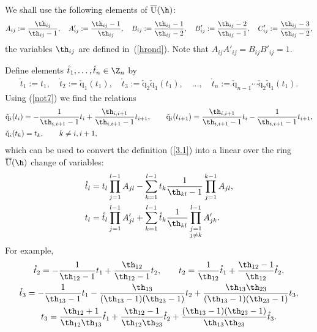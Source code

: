 \documentclass[11pt]{article}
\def\Cprime{C'}\def\ds{\displaystyle}\newcommand{\fracds}[2]{{\ds \frac{#1}{#2}}}
\def\q{\check{\mathrm q}}\def\Q{\mathrm{Q}}\def\r#1{(\ref{#1})}\let\rf=\r
\def\tphi{A}\def\tpsi{A'}\def\tphiplus{B}\def\tpsiminus{B'}\def\ttphi{B}\def\ttpsi{B'}\def\ts{\hskip1pt}\def\tts{\hskip.5pt}
\def\tt{\mathring{t}}\def\U{\mathrm{U}}\def\Uh{\overline{\U}(\h)}\def\UU{\overline{\U}}\def\UUh{{\cal{D}}(\h)}
\numberwithin{equation}{section}
\begin{document}
We shall use the following elements of $\Uh$:
\begin{gather*}  \tphi_{ij}:=\frac{\th_{ij}}{\th_{ij}-1}  ,\quad \tpsi_{ij}:=\frac{\th_{ij}-1}{\th_{ij}} ,
\quad \ttphi_{ij}:=\frac{\th_{ij}-1}{\th_{ij}-2} ,\quad \ttpsi_{ij}:=\frac{\th_{ij}-2}{\th_{ij}-1} ,\quad \Cprime_{ij}:=\frac{\th_{ij}-3}{\th_{ij}-2},
\end{gather*}
the variables $\th_{ij}$ are def\/ined in~\rf{hrond}. Note that $\tphi_{ij}\tpsi_{ij}=\ttphi_{ij}\ttpsi_{ij}=1$.


Def\/ine  elements $\tt_1,\ldots, \tt_n\in\Z_n$ by
\begin{gather*}
\label{3.1}
\tt_1:=t_1 ,\quad\tt_2:=\q_{1}(t_1) ,\quad\tt_3:=\q_{2}\q_{1}(t_1) ,
\quad\ldots, \quad \tt_n:=\q_{n-1}\cdots \q_{2}\q_{1}(t_1)  .
\end{gather*}
Using \rf{not7} we f\/ind the relations
 \begin{gather}
 \begin{split}
& \q_i(t_i)  =-\frac{1}{\th_{i,i+1}-1}t_i+\frac{\th_{i,i+1}}{\th_{i,i+1}-1}t_{i+1}  ,
\qquad \q_i(t_{i+1})= \frac{\th_{i,i+1}}{\th_{i,i+1}-1}t_i-\frac{1}{\th_{i,i+1}-1}t_{i+1} ,\\ %
& \q_i(t_k) =  t_k ,\qquad k\not=i,i+1  ,
 \end{split}\label{acwot}
 \end{gather}
which can be used to convert the def\/inition \rf{3.1} into  a linear over the ring $\Uh$ change of variables:
\begin{gather}
\begin{split}
& \ds{\tt_l} =\ds{t_l\prod_{j=1}^{l-1}\tphi_{jl}
-\sum_{k=1}^{l-1}t_k\frac{1}{\th_{kl}-1}\prod_{j=1}^{k-1}\tphi_{jl}}  , \\
& \ds{t_l} =\ds{\tt_l\prod_{j=1}^{l-1}\tpsi_{jl} +\sum_{k=1}^{l-1}\tt_k\frac{1}{\th_{kl}}
\prod_{\substack{j=1 \\ j\neq k}}^{l-1}\tpsi_{jk}} .
\end{split} \label{3.1a}
\end{gather}
For example,
\begin{gather*}
\tt_2 =-\frac{1}{\th_{12}-1}t_1+\frac{\th_{12}}{\th_{12}-1}t_2 ,\qquad
t_2=\frac{1}{\th_{12}}\tt_1+\frac{\th_{12}-1}{\th_{12}}\tt_2 ,\\
\tt_3 =-\frac{1}{\th_{13}-1}t_1-\frac{\th_{13}}{(\th_{13}-1)(\th_{23}-1)}t_2+
\frac{\th_{13}\th_{23}}{(\th_{13}-1)(\th_{23}-1)}t_3  ,\\
t_3 =  \frac{\th_{12}+1}{\th_{12}\th_{13}}\tt_1+\frac{\th_{12}-1}{\th_{12}\th_{23}}\tt_2+
\frac{(\th_{13}-1)(\th_{23}-1)}{\th_{13}\th_{23}}\tt_3  .
\end{gather*}
\end{document}
